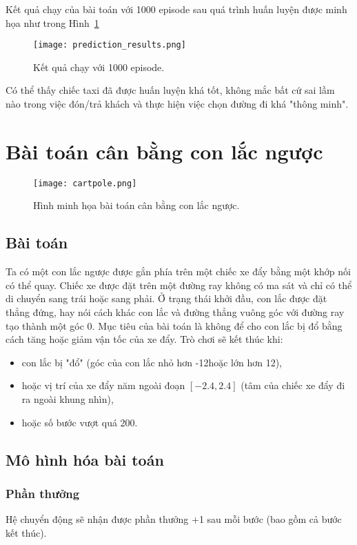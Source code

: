 Kết quả chạy của bài toán với 1000 episode
sau quá trình huấn luyện được minh họa như trong Hình~\ref{fig:prediction_results}

\begin{figure}[H]
    \centering
    \texttt{[image: prediction\_results.png]}
    \caption{Kết quả chạy với 1000 episode.}
    \label{fig:prediction_results}
\end{figure}

Có thể thấy chiếc taxi đã được huấn luyện khá tốt,
không mắc bất cứ sai lầm nào trong việc đón/trả khách
và thực hiện việc chọn đường đi khá "thông minh".


\section{Bài toán cân bằng con lắc ngược}

\begin{figure}[H]
    \centering
    \texttt{[image: cartpole.png]}
    \caption{Hình minh họa bài toán cân bằng con lắc ngược.}
    \label{fig:cartpole}
\end{figure}

\subsection{Bài toán}
Ta có một con lắc ngược được gắn phía trên
một chiếc xe đẩy bằng một khớp nối có thể quay.
Chiếc xe được đặt trên một đường ray không có ma sát
và chỉ có thể di chuyển sang trái hoặc sang phải.
Ở trạng thái khởi đầu, con lắc được đặt thẳng đứng,
hay nói cách khác con lắc và đường thẳng vuông góc
với đường ray tạo thành một góc 0\degree.
Mục tiêu của bài toán là không để cho con lắc bị đổ
bằng cách tăng hoặc giảm vận tốc của xe đẩy.
Trò chơi sẽ kết thúc khi:
\begin{itemize}
    \item con lắc bị "đổ"
    (góc của con lắc nhỏ hơn -12\degree hoặc lớn hơn 12\degree),
    \item hoặc vị trí của xe đẩy năm ngoài đoạn $[-2.4, 2.4]$
    (tâm của chiếc xe đẩy đi ra ngoài khung nhìn),
    \item hoặc số bước vượt quá 200.
\end{itemize}

\subsection{Mô hình hóa bài toán}
\subsubsection{Phần thưởng}
Hệ chuyển động sẽ nhận được phần thưởng +1 sau mỗi bước
(bao gồm cả bước kết thúc).

